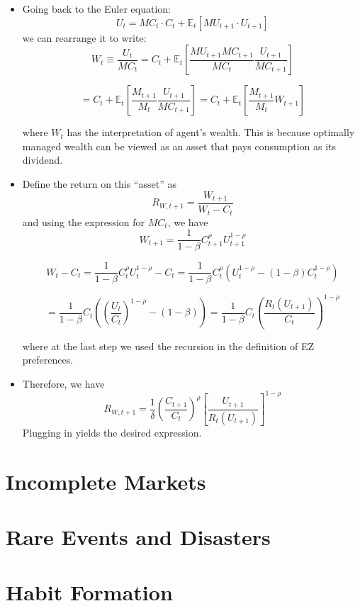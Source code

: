 \documentclass[
]{book}
\begin{document}
\begin{itemize}
\item
  Going back to the Euler equation:
  \[
  U_{t}=MC_{t}\cdot C_{t}+\mathbb{E}_{t}\left[MU_{t+1}\cdot U_{t+1}\right]
  \]
  we can rearrange it to write:
  \[
  W_{t}\equiv\frac{U_{t}}{MC_{t}}=C_{t}+\mathbb{E}_{t}\left[\frac{MU_{t+1}MC_{t+1}}{MC_{t}}\frac{U_{t+1}}{MC_{t+1}}\right]
  \]

  \[
  =C_{t}+\mathbb{E}_{t}\left[\frac{M_{t+1}}{M_{t}}\frac{U_{t+1}}{MC_{t+1}}\right]=C_{t}+\mathbb{E}_{t}\left[\frac{M_{t+1}}{M_{t}}W_{t+1}\right]
  \]

  where \(W_t\) has the interpretation of agent's wealth. This is because optimally managed wealth can be viewed as an asset that pays consumption as its dividend.
\item
  Define the return on this ``asset'' as
  \[
  R_{W,t+1}=\frac{W_{t+1}}{W_{t}-C_{t}}
  \]
  and using the expression for \(MC_t\), we have
  \[
  W_{t+1}=\frac{1}{1-\beta}C_{t+1}^{\rho}U_{t+1}^{1-\rho}
  \]

  \[
  W_t-C_t = \frac{1}{1-\beta}C_{t}^{\rho}U_{t}^{1-\rho}-C_{t}=\frac{1}{1-\beta}C_{t}^{\rho}\left(U_{t}^{1-\rho}-\left(1-\beta\right)C_{t}^{1-\rho}\right)
  \]

  \[
  =\frac{1}{1-\beta}C_{t}\left(\left(\frac{U_{t}}{C_{t}}\right)^{1-\rho}-\left(1-\beta\right)\right)=\frac{1}{1-\beta}C_{t}\left(\frac{R_{t}\left(U_{t+1}\right)}{C_{t}}\right)^{1-\rho}
  \]

  where at the last step we used the recursion in the definition of EZ preferences.
\item
  Therefore, we have
  \[
  R_{W,t+1}=\frac{1}{\delta}\left(\frac{C_{t+1}}{C_{t}}\right)^{\rho}\left[\frac{U_{t+1}}{R_{t}\left(U_{t+1}\right)}\right]^{1-\rho}
  \]
  Plugging in yields the desired expression.
\end{itemize}

\hypertarget{incomplete-markets}{%
\chapter{Incomplete Markets}\label{incomplete-markets}}

\hypertarget{rare-events-and-disasters}{%
\chapter{Rare Events and Disasters}\label{rare-events-and-disasters}}

\hypertarget{habit-formation}{%
\chapter{Habit Formation}\label{habit-formation}}
\end{document}
